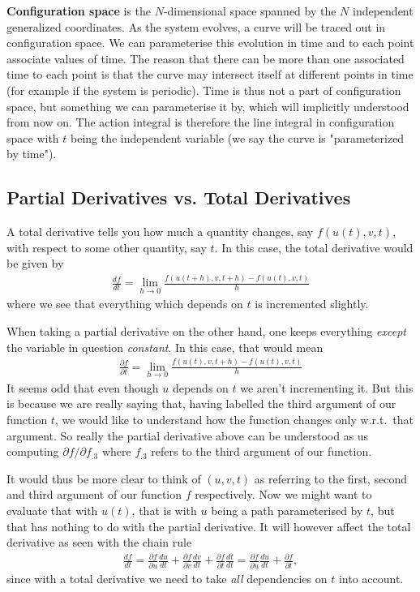 \documentclass[a4paper]{article}
\begin{document}
    \textbf{Configuration space} is the \(N\)-dimensional space spanned by the \(N\) independent generalized coordinates. As the system evolves, a curve will be traced out in configuration space. We can parameterise this evolution in time and to each point associate values of time. The reason that there can be more than one associated time to each point is that the curve may intersect itself at different points in time (for example if the system is periodic). Time is thus not a part of configuration space, but something we can parameterise it by, which will implicitly understood from now on. The action integral is therefore the line integral in configuration space with \(t\) being the independent variable (we say the curve is "parameterized by time"). 
    
    \subsection{Partial Derivatives vs. Total Derivatives}
    A total derivative tells you how much a quantity changes, say \(f(u(t), v, t)\), with respect to some other quantity, say \(t\). In this case, the total derivative would be given by \begin{align*}
        \frac{df}{dt} = \lim_{h \to 0} \frac{f(u(t + h), v, t + h) - f(u(t), v, t)}{h}
    \end{align*}
    where we see that everything which depends on \(t\) is incremented slightly.

    When taking a partial derivative on the other hand, one keeps everything \textit{except} the variable in question \textit{constant}. In this case, that would mean \begin{align*}
        \frac{\partial f}{\partial t} = \lim_{h \to 0} \frac{f(u(t), v, t + h) - f(u(t), v, t)}{h} 
    \end{align*}
    It seems odd that even though \(u\) depends on \(t\) we aren't incrementing it. But this is because we are really saying that, having labelled the third argument of our function \(t\), we would like to understand how the function changes only w.r.t.\ that argument. So really the partial derivative above can be understood as us computing \(\partial f / \partial f_{.3}\) where \(f_{.3}\) refers to the third argument of our function.

    It would thus be more clear to think of \((u, v, t)\) as referring to the first, second and third argument of our function \(f\) respectively. Now we might want to evaluate that with \(u(t)\), that is with \(u\) being a path parameterised by \(t\), but that has nothing to do with the partial derivative. It will however affect the total derivative as seen with the chain rule \begin{align*}
        \frac{df}{dt} = \frac{\partial f}{\partial u} \frac{du}{dt} + \frac{\partial f}{\partial v} \frac{dv}{dt} + \frac{\partial f}{\partial t} \frac{dt}{dt} = \frac{\partial f}{\partial u} \frac{du}{dt} + \frac{\partial f}{\partial t},
    \end{align*}
    since with a total derivative we need to take \textit{all} dependencies on \(t\) into account.
\end{document}
